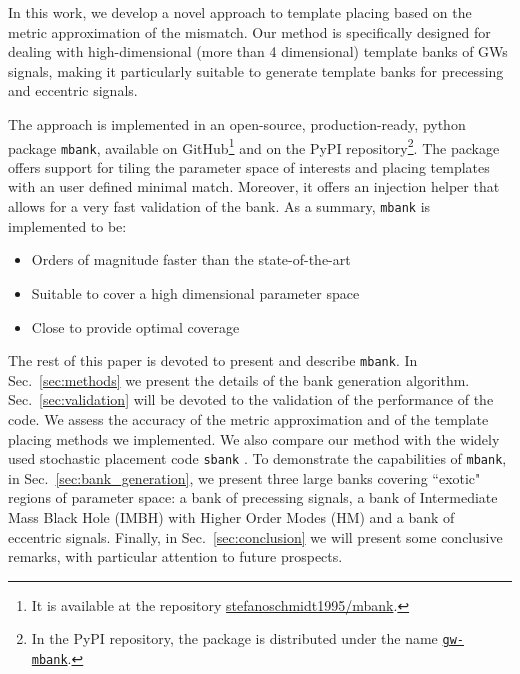 \documentclass[twocolumn,showpacs,preprintnumbers,nofootinbib,prd,
superscriptaddress,10pt]{revtex4-2}
\begin{document}
In this work, we develop a novel approach to template placing based on the metric approximation of the mismatch.
Our method is specifically designed for dealing with high-dimensional (more than 4 dimensional) template banks of GWs signals, making it particularly suitable to generate template banks for precessing and eccentric signals.

The approach is implemented in an open-source, production-ready, python package \texttt{mbank}, available on GitHub\footnote{
It is available at the repository \href{https://github.com/stefanoschmidt1995/mbank}{stefanoschmidt1995/mbank}.}
and on the PyPI repository\footnote{
In the PyPI repository, the package is distributed under the name \texttt{\href{https://pypi.org/project/gw-mbank/}{gw-mbank}}.
}.
The package offers support for tiling the parameter space of interests and placing templates with an user defined minimal match. Moreover, it offers an injection helper that allows for a very fast validation of the bank.
As a summary, \texttt{mbank} is implemented to be:
\begin{itemize}
	\item Orders of magnitude faster than the state-of-the-art
	\item Suitable to cover a high dimensional parameter space
	\item Close to provide optimal coverage
\end{itemize}

The rest of this paper is devoted to present and describe \texttt{mbank}.
In Sec.~\ref{sec:methods} we present the details of the bank generation algorithm.
Sec.~\ref{sec:validation} will be devoted to the validation of the performance of the code. We assess the accuracy of the metric approximation and of the template placing methods we implemented. We also compare our method with the widely used stochastic placement code \texttt{sbank} \cite{sbank}.
To demonstrate the capabilities of \texttt{mbank}, in Sec.~\ref{sec:bank_generation}, we present three large banks covering ``exotic" regions of parameter space: a bank of precessing signals, a bank of Intermediate Mass Black Hole (IMBH) with Higher Order Modes (HM) and a bank of eccentric signals.
Finally, in Sec.~\ref{sec:conclusion} we will present some conclusive remarks, with particular attention to future prospects.

\end{document}
